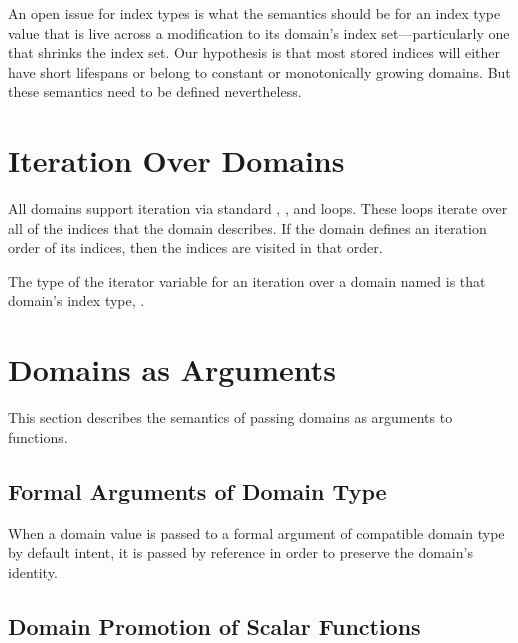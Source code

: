 \begin{openissue}

An open issue for index types is what the semantics should be for an
index type value that is live across a modification to its domain's
index set---particularly one that shrinks the index set.  Our
hypothesis is that most stored indices will either have short
lifespans or belong to constant or monotonically growing domains.  But
these semantics need to be defined nevertheless.

\end{openissue}

\section{Iteration Over Domains}
\label{Iteration_over_Domains}

All domains support iteration via standard , , and 
loops.  These loops iterate over all of the indices that the domain
describes.  If the domain defines an iteration order of its indices,
then the indices are visited in that order.  

The type of the iterator variable for an iteration over a
domain named  is that domain's index type, .


\section{Domains as Arguments}
\label{Domain_Arguments}

This section describes the semantics of passing domains as arguments
to functions.

\subsection{Formal Arguments of Domain Type}

When a domain value is passed to a formal argument of compatible
domain type by default intent, it is passed by reference in order to
preserve the domain's identity.

\subsection{Domain Promotion of Scalar Functions}
\label{Domain_Promotion_of_Scalar_Functions}

